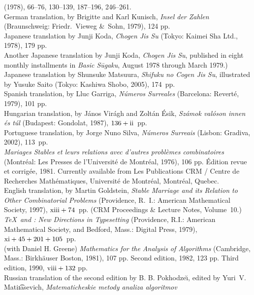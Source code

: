  (1978), 66--76, 130--139, 187--196, 246--261.
\\German translation, by Brigitte and Karl Kunisch, {\sl Insel der Zahlen\/}
 (Braunschweig: Friedr.\ Vieweg \&\ Sohn, 1979), 124 pp.
\\Japanese translation by Junji Koda, {\sl Chogen Jis Su\/}
 (Tokyo: Kaimei Sha Ltd., 1978), 179 pp. 
\\Another Japanese translation by Junji Koda, {\sl Chogen Jis Su\/},
 published in eight monthly installments
 in {\sl Basic S\=ugaku}, August 1978 through March 1979.)
\\Japanese translation by Shunsuke Matsuura, {\sl Shifuku no Cogen Jis Su\/},
 illustrated by Yusuke Saito (Tokyo: Kashiwa Shobo, 2005), 174~pp.
\\Spanish translation, by Lluc Garriga, {\sl N\'umeros Surreales\/} 
 (Barcelona: Revert\'e, 1979), 101 pp.
\\Hungarian translation, by J\'anos Vir\'agh and Zolt\'an \'Esik,
 {\sl Sz\'amok val\'oson innen \'es t\'ul\/} (Budapest: Gondolat, 1987),
 $136+\rm ii$~pp.
\\Portuguese translation, by Jorge Nuno Silva, {\sl N\'umeros Surreais\/}
 (Lisbon: Gradiva, 2002), 113~pp.
\yyskip
\\{\sl Mariages Stables et leurs relations avec d'autres probl\`emes
 combinatoires\/} (Montr\'eal: Les Presses de l'Uni\-ver\-sit\'e de Montr\'eal,
 1976), 106 pp.  \'Edition revue et corrig\'ee, 1981. Currently
 available from Les Publications CRM / Centre de Recherches Math\'ematiques,
 Universit\'e de Montr\'eal, Montr\'eal, Quebec.
\\English translation, by Martin Goldstein, {\sl Stable Marriage and its
 Relation to Other Combinatorial Problems\/} (Providence, R.~I.: American
 Mathematical Society, 1997), $\rm xiii+74$~pp. (CRM Proceedings \& Lecture
 Notes, Volume~10.)
\yyskip
\\{\sl \TeX\ and \slMF:  New Directions in Typesetting}
 (Providence, R.I.:  American Mathematical Society,
 and Bedford, Mass.:  Digital Press, 1979), $\rm xi + 45 + 201 + 105$~pp.
\yyskip
\\(with Daniel H. Greene)\xskip
 {\sl Mathematics for the Analysis of Algorithms\/}
 (Cambridge, Mass.: Birkh\"auser Boston, 1981), 107 pp.
 Second edition, 1982, 123 pp.
 Third edition, 1990, $\rm viii+132$ pp.
\\Russian translation of the second edition by B. B. Pokhodze\u\i, edited by
 Yuri~V. Mati\t\i asevich, {\sl Matematicheskie metody analiza algoritmov\/}
